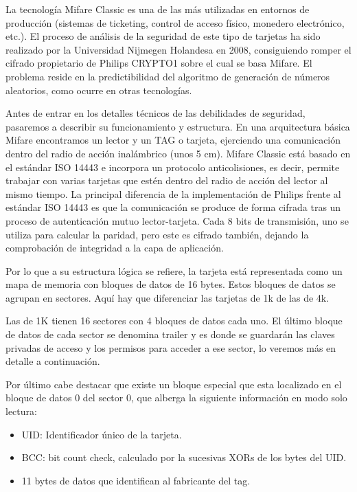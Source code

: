 La tecnología Mifare Classic es una de las más utilizadas en entornos de
producción (sistemas de ticketing, control de acceso físico, monedero
electrónico, etc.). El proceso de análisis de la seguridad de este tipo
de tarjetas ha sido realizado por la Universidad Nijmegen Holandesa en
2008, consiguiendo romper el cifrado propietario de Philips CRYPTO1
sobre el cual se basa Mifare. El problema reside en la predictibilidad
del algoritmo de generación de números aleatorios, como ocurre en otras
tecnologías.

Antes de entrar en los detalles técnicos de las debilidades de
seguridad, pasaremos a describir su funcionamiento y estructura. En una
arquitectura básica Mifare encontramos un lector y un TAG o tarjeta,
ejerciendo una comunicación dentro del radio de acción inalámbrico (unos
5 cm). Mifare Classic está basado en el estándar ISO 14443 e incorpora
un protocolo anticolisiones, es decir, permite trabajar con varias
tarjetas que estén dentro del radio de acción del lector al mismo
tiempo. La principal diferencia de la implementación de Philips frente
al estándar ISO 14443 es que la comunicación se produce de forma cifrada
tras un proceso de autenticación mutuo lector-tarjeta. Cada 8 bits de
transmisión, uno se utiliza para calcular la paridad, pero este es
cifrado también, dejando la comprobación de integridad a la capa de
aplicación.



Por lo que a su estructura lógica se refiere, la tarjeta está
representada como un mapa de memoria con bloques de datos de 16 bytes.
Estos bloques de datos se agrupan en sectores. Aquí hay que diferenciar
las tarjetas de 1k de las de 4k.

Las de 1K tienen 16 sectores con 4 bloques de datos cada uno. El último
bloque de datos de cada sector se denomina trailer y es donde se
guardarán las claves privadas de acceso y los permisos para acceder a
ese sector, lo veremos más en detalle a continuación.



Por último cabe destacar que existe un bloque especial que esta
localizado en el bloque de datos 0 del sector 0, que alberga la
siguiente información en modo solo lectura:

\begin{itemize}
\itemsep1pt\parskip0pt
\item
  UID: Identificador único de la tarjeta.
\item
  BCC: bit count check, calculado por la sucesivas XORs de los bytes del
  UID.
\item
  11 bytes de datos que identifican al fabricante del tag.
\end{itemize}

